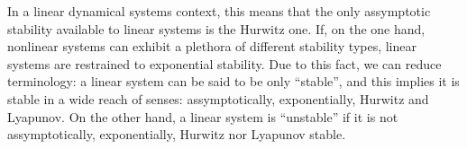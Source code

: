 	In a linear dynamical systems context, this means that the only assymptotic stability available to linear systems is the Hurwitz one. If, on the one hand, nonlinear systems can exhibit a plethora of different stability types, linear systems are restrained to exponential stability. Due to this fact, we can reduce terminology: a linear system can be said to be only ``stable'', and this implies it is stable in a wide reach of senses: assymptotically, exponentially, Hurwitz and Lyapunov. On the other hand, a linear system is ``unstable'' if it is not assymptotically, exponentially, Hurwitz nor Lyapunov stable.
